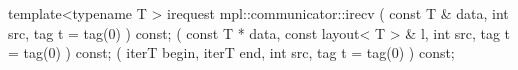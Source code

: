 template<typename T >
irequest mpl::communicator::irecv
   ( const T & data, int src, tag t = tag(0) ) const;
   ( const T * data, const layout< T > &  l, int  src, tag  t = tag(0) ) const;
   ( iterT  begin, iterT  end, int  src, tag  t = tag(0) ) const;
